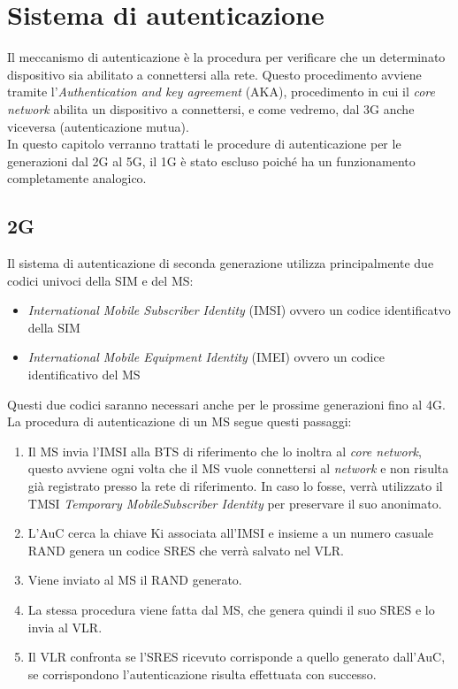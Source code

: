 \chapter{Sistema di autenticazione}
Il meccanismo di autenticazione è la procedura per verificare che un determinato dispositivo
sia abilitato a connettersi alla rete.
Questo procedimento avviene tramite l'\textit{Authentication and key agreement} (AKA), procedimento in cui
il \textit{core network} abilita un dispositivo a connettersi, e come vedremo, dal 3G anche viceversa (autenticazione mutua).\\
In questo capitolo verranno trattati le procedure di autenticazione\cite{identifications} per le generazioni dal 2G al 5G, il 1G è stato escluso 
poiché ha un funzionamento completamente analogico.

\clearpage

\section{2G}
Il sistema di autenticazione di seconda generazione utilizza principalmente due codici univoci della SIM e del MS:
\begin{itemize}
    \item \textit{International Mobile Subscriber Identity} (IMSI) ovvero un codice identificatvo della SIM
    \item \textit{International Mobile Equipment Identity} (IMEI) ovvero un codice identificativo del MS
\end{itemize}
Questi due codici saranno necessari anche per le prossime generazioni fino al 4G.\\
La procedura di autenticazione di un MS segue questi passaggi:
\begin{enumerate}
    \item Il MS invia l'IMSI alla BTS di riferimento che lo inoltra al \textit{core network}, questo
    avviene ogni volta che il MS vuole connettersi al \textit{network} e non risulta già registrato presso 
    la rete di riferimento. In caso lo fosse, verrà utilizzato il TMSI \textit{Temporary MobileSubscriber Identity}
    per preservare il suo anonimato.
    \item L'AuC cerca la chiave Ki associata all'IMSI e insieme a un numero casuale RAND genera un codice SRES che verrà
    salvato nel VLR.
    \item Viene inviato al MS il RAND generato.
    \item La stessa procedura viene fatta dal MS, che genera quindi il suo SRES e lo invia al VLR.
    \item Il VLR confronta se l'SRES ricevuto corrisponde a quello generato dall'AuC, se corrispondono l'autenticazione risulta
    effettuata con successo.
\end{enumerate}

